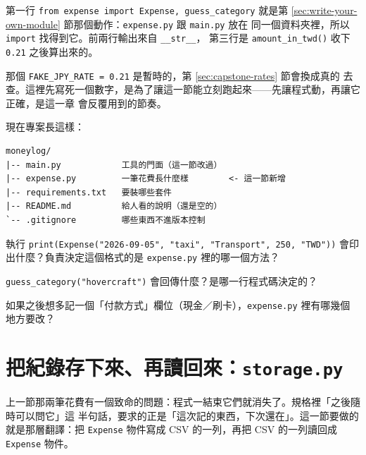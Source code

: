 
第一行 \texttt{from expense import Expense, guess\_category} 就是第
\ref{sec:write-your-own-module} 節那個動作：\texttt{expense.py} 跟 \texttt{main.py} 放在
同一個資料夾裡，所以 \texttt{import} 找得到它。前兩行輸出來自 \texttt{\_\_str\_\_}，
第三行是 \texttt{amount\_in\_twd()} 收下 \texttt{0.21} 之後算出來的。

那個 \texttt{FAKE\_JPY\_RATE = 0.21} 是暫時的，第 \ref{sec:capstone-rates} 節會換成真的
去查。這裡先寫死一個數字，是為了讓這一節能立刻跑起來——先讓程式動，再讓它正確，是這一章
會反覆用到的節奏。

現在專案長這樣：

\begin{verbatim}
moneylog/
|-- main.py            工具的門面（這一節改過）
|-- expense.py         一筆花費長什麼樣        <- 這一節新增
|-- requirements.txt   要裝哪些套件
|-- README.md          給人看的說明（還是空的）
`-- .gitignore         哪些東西不進版本控制
\end{verbatim}


\begin{drills}[label=drills:capstone-model]
\item 執行 \texttt{print(Expense("2026-09-05", "taxi", "Transport", 250, "TWD"))}
會印出什麼？負責決定這個格式的是 \texttt{expense.py} 裡的哪一個方法？
\item \texttt{guess\_category("hovercraft")} 會回傳什麼？是哪一行程式碼決定的？
\item 如果之後想多記一個「付款方式」欄位（現金／刷卡），\texttt{expense.py} 裡有哪幾個
地方要改？
\end{drills}

\section{把紀錄存下來、再讀回來：\texttt{storage.py}}
\label{sec:capstone-storage}

上一節那兩筆花費有一個致命的問題：程式一結束它們就消失了。規格裡「之後隨時可以問它」這
半句話，要求的正是「這次記的東西，下次還在」。這一節要做的就是那層翻譯：把
\texttt{Expense} 物件寫成 CSV 的一列，再把 CSV 的一列讀回成 \texttt{Expense} 物件。

